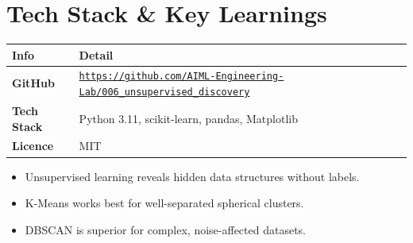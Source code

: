 \documentclass[11pt,a4paper]{article}
\begin{document}
\section{Tech Stack \& Key Learnings}

\begin{tabularx}{\linewidth}{@{}>{\bfseries}l X @{}}
  \arrayrulecolor{tableheader}
  \toprule
  \rowcolor{tableheader} Info & Detail \\
  \midrule
  \rowcolor{white} GitHub & \href{https://github.com/AIML-Engineering-Lab/006_unsupervised_discovery}{\nolinkurl{https://github.com/AIML-Engineering-Lab/006_unsupervised_discovery}} \\
  \rowcolor{tablerow} Tech Stack & Python 3.11, scikit-learn, pandas, Matplotlib \\
  \rowcolor{white} Licence & MIT \\
  \bottomrule
\end{tabularx}

\vspace{4pt}
\begin{itemize}[leftmargin=18pt,itemsep=2pt]
  \item Unsupervised learning reveals hidden data structures without labels.
  \item K-Means works best for well-separated spherical clusters.
  \item DBSCAN is superior for complex, noise-affected datasets.
\end{itemize}
\end{document}
